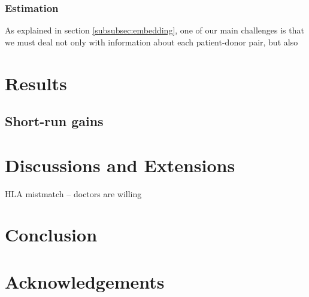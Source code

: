 \documentclass[12pt]{article}
\begin{document}
% 
% 
% 
% 
% 
% 



\subsubsection{Estimation} \label{subsubsec:estimation}

As explained in section \ref{subsubsec:embedding}, one of our main challenges is that we must deal not only with information about each patient-donor pair, but also 




\section{Results} \label{sec:results}



\subsection{Short-run gains}

\section{Discussions and Extensions} \label{sec:discussion}

HLA mistmatch -- doctors are willing 

\section{Conclusion} \label{sec:conclusion}


\section{Acknowledgements}
\end{document}
